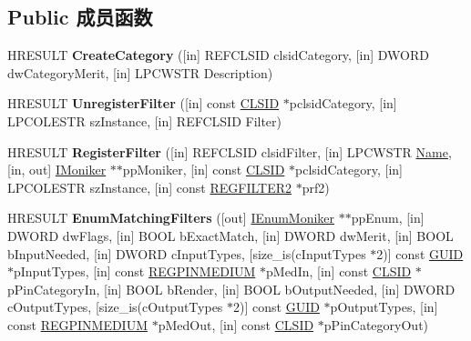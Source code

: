 \subsection*{Public 成员函数}
\begin{DoxyCompactItemize}
\item 
\mbox{\label{interface_i_filter_mapper2_ae02d0e812141296ac5547f89b53d09b8}} 
H\+R\+E\+S\+U\+LT {\bfseries Create\+Category} (\mbox{[}in\mbox{]} R\+E\+F\+C\+L\+S\+ID clsid\+Category, \mbox{[}in\mbox{]} D\+W\+O\+RD dw\+Category\+Merit, \mbox{[}in\mbox{]} L\+P\+C\+W\+S\+TR Description)
\item 
\mbox{\label{interface_i_filter_mapper2_ab2aa021715ebe7b20dfdbaef0c5577c1}} 
H\+R\+E\+S\+U\+LT {\bfseries Unregister\+Filter} (\mbox{[}in\mbox{]} const \hyperlink{struct___i_i_d}{C\+L\+S\+ID} $\ast$pclsid\+Category, \mbox{[}in\mbox{]} L\+P\+C\+O\+L\+E\+S\+TR sz\+Instance, \mbox{[}in\mbox{]} R\+E\+F\+C\+L\+S\+ID Filter)
\item 
\mbox{\label{interface_i_filter_mapper2_a91208b39021a9c7d80ad0e94b6796ec2}} 
H\+R\+E\+S\+U\+LT {\bfseries Register\+Filter} (\mbox{[}in\mbox{]} R\+E\+F\+C\+L\+S\+ID clsid\+Filter, \mbox{[}in\mbox{]} L\+P\+C\+W\+S\+TR \hyperlink{struct_name_rec__}{Name}, \mbox{[}in, out\mbox{]} \hyperlink{interface_i_moniker}{I\+Moniker} $\ast$$\ast$pp\+Moniker, \mbox{[}in\mbox{]} const \hyperlink{struct___i_i_d}{C\+L\+S\+ID} $\ast$pclsid\+Category, \mbox{[}in\mbox{]} L\+P\+C\+O\+L\+E\+S\+TR sz\+Instance, \mbox{[}in\mbox{]} const \hyperlink{struct_r_e_g_f_i_l_t_e_r2}{R\+E\+G\+F\+I\+L\+T\+E\+R2} $\ast$prf2)
\item 
\mbox{\label{interface_i_filter_mapper2_a5864cbf52916d5eb6b791d85d3770371}} 
H\+R\+E\+S\+U\+LT {\bfseries Enum\+Matching\+Filters} (\mbox{[}out\mbox{]} \hyperlink{interface_i_enum_moniker}{I\+Enum\+Moniker} $\ast$$\ast$pp\+Enum, \mbox{[}in\mbox{]} D\+W\+O\+RD dw\+Flags, \mbox{[}in\mbox{]} B\+O\+OL b\+Exact\+Match, \mbox{[}in\mbox{]} D\+W\+O\+RD dw\+Merit, \mbox{[}in\mbox{]} B\+O\+OL b\+Input\+Needed, \mbox{[}in\mbox{]} D\+W\+O\+RD c\+Input\+Types, \mbox{[}size\+\_\+is(c\+Input\+Types $\ast$2)\mbox{]} const \hyperlink{interface_g_u_i_d}{G\+U\+ID} $\ast$p\+Input\+Types, \mbox{[}in\mbox{]} const \hyperlink{struct_r_e_g_p_i_n_m_e_d_i_u_m}{R\+E\+G\+P\+I\+N\+M\+E\+D\+I\+UM} $\ast$p\+Med\+In, \mbox{[}in\mbox{]} const \hyperlink{struct___i_i_d}{C\+L\+S\+ID} $\ast$p\+Pin\+Category\+In, \mbox{[}in\mbox{]} B\+O\+OL b\+Render, \mbox{[}in\mbox{]} B\+O\+OL b\+Output\+Needed, \mbox{[}in\mbox{]} D\+W\+O\+RD c\+Output\+Types, \mbox{[}size\+\_\+is(c\+Output\+Types $\ast$2)\mbox{]} const \hyperlink{interface_g_u_i_d}{G\+U\+ID} $\ast$p\+Output\+Types, \mbox{[}in\mbox{]} const \hyperlink{struct_r_e_g_p_i_n_m_e_d_i_u_m}{R\+E\+G\+P\+I\+N\+M\+E\+D\+I\+UM} $\ast$p\+Med\+Out, \mbox{[}in\mbox{]} const \hyperlink{struct___i_i_d}{C\+L\+S\+ID} $\ast$p\+Pin\+Category\+Out)
\end{DoxyCompactItemize}
